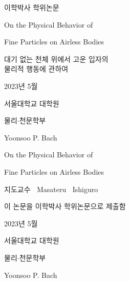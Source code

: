 \def\tTitleA{{On the Physical Behavior of}}
\def\tTitleB{{Fine Particles on Airless Bodies}}
\def\tTitleK{{대기 없는 천체 위에서 고운 입자의 \\물리적 행동에 관하여}}
\def\tDepartment{{물리$\cdot$천문학부}}
\def\tDate{{2023년 5월}}
\def\tName{{Yoonsoo P. Bach}}
\def\tNameWithBlank{{Yoonsoo P. Bach}}

\renewcommand{\baselinestretch}{1}
\centering
{\Large \quad \par}
\vspace{.5cm}
{\Large 이학박사 학위논문 \par}
\vspace{2cm}
{\Huge \tTitleA \par}
\vspace{.3cm}
{\Huge \tTitleB \par}
\vspace{2cm}
{\LARGE \tTitleK \par}
\vspace{4.5cm}
{\Large \tDate \par}
\vspace{3cm}
{\LARGE 서울대학교 대학원 \par}
\vspace{.5cm}
{\Large \tDepartment \par}
\vspace{.5cm}
{\LARGE \tNameWithBlank \par}

\clearpage

\centering
{\Large \quad \par}
\vspace{.1cm}
{\Huge \tTitleA \par}
\vspace{.3cm}
{\Huge \tTitleB \par}
\vspace{1.5cm}
{\LARGE 지도교수 $\ $ Masateru $\ $ Ishiguro \par}
\vspace{1cm}
{\LARGE 이 논문을 이학박사 학위논문으로 제출함 \par}
\vspace{.2cm}
{\Large \tDate \par}

\vspace{.9cm}
{\LARGE 서울대학교 대학원 \par}
\vspace{.3cm}
{\Large \tDepartment \par}
\vspace{.3cm}
{\LARGE \tNameWithBlank \par}
\vspace{.9cm}

